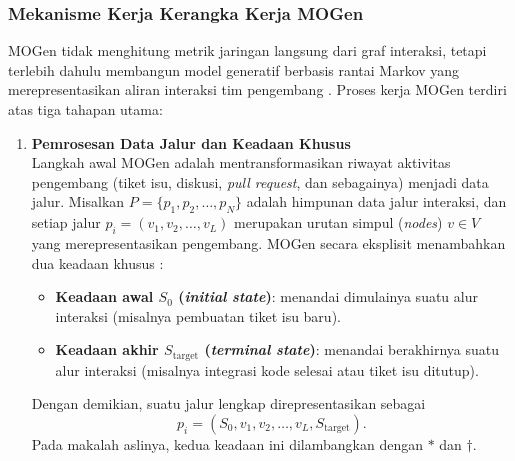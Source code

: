 \subsubsection{Mekanisme Kerja Kerangka Kerja MOGen}
MOGen tidak menghitung metrik jaringan langsung dari graf interaksi, tetapi terlebih dahulu membangun model generatif berbasis rantai Markov yang merepresentasikan aliran interaksi tim pengembang \parencite{gote2023mogen}.
Proses kerja MOGen terdiri atas tiga tahapan utama:
\begin{enumerate}[label=\textbf{\arabic*.}, leftmargin=2.8em, itemsep=0.7em, parsep=0.25em]
    \item \textbf{Pemrosesan Data Jalur dan Keadaan Khusus}\\
    Langkah awal MOGen adalah mentransformasikan riwayat aktivitas pengembang (tiket isu, diskusi, \textit{pull request}, dan sebagainya) menjadi data jalur.
    Misalkan $P = \{p_1, p_2, \ldots, p_N\}$ adalah himpunan data jalur interaksi, dan setiap jalur $p_i = (v_1, v_2, \ldots, v_L)$ merupakan urutan simpul (\textit{nodes}) $v \in V$ yang merepresentasikan pengembang.
    MOGen secara eksplisit menambahkan dua keadaan khusus \parencite{gote2023mogen}:
    \begin{itemize}[leftmargin=1.6em]
        \item \textbf{Keadaan awal $S_{0}$ (\textit{initial state})}: menandai dimulainya suatu alur interaksi (misalnya pembuatan tiket isu baru).
        \item \textbf{Keadaan akhir $S_{\mathrm{target}}$ (\textit{terminal state})}: menandai berakhirnya suatu alur interaksi (misalnya integrasi kode selesai atau tiket isu ditutup).
    \end{itemize}
    Dengan demikian, suatu jalur lengkap direpresentasikan sebagai
    \begin{equation}
    p_i = (S_{0}, v_1, v_2, \ldots, v_L, S_{\mathrm{target}}).
    \end{equation}
    Pada makalah aslinya, kedua keadaan ini dilambangkan dengan $*$ dan $\dagger$.


\end{enumerate}
